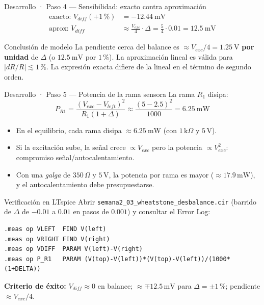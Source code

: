 \documentclass[aspectratio=169]{beamer}
\begin{document}
\begin{frame}{Desarrollo · Paso 4 — Sensibilidad: exacto contra aproximación}
  \begin{align*}
    \text{exacto: } V_{diff}(+1\,\text{\%}) &= -\SI{12.44}{\milli\volt}\\[2pt]
    \text{aprox: } V_{diff} &\approx \frac{V_{exc}}{4}\cdot\Delta = \frac{5}{4}\cdot 0.01 = \SI{12.5}{\milli\volt}
  \end{align*}
  \pause
  \begin{block}{Conclusión de modelo}
    La pendiente cerca del balance es $\approx V_{exc}/4 = \SI{1.25}{\volt}$ \textbf{por unidad} de $\Delta$
    (o $\SI{12.5}{\milli\volt}$ por $1\,\text{\%}$). La aproximación lineal es válida para $|dR/R| \lesssim 1\,\text{\%}$.
    La expresión exacta difiere de la lineal en el término de segundo orden.
  \end{block}
\end{frame}

\begin{frame}{Desarrollo · Paso 5 — Potencia de la rama sensora}
  La rama $R_1$ disipa:
  \[
    P_{R1} = \frac{\left(V_{exc} - V_{left}\right)^2}{R_1(1+\Delta)}
    \approx \frac{(5-2.5)^2}{1000} = \SI{6.25}{\milli\watt}
  \]
  \pause
  \begin{itemize}
    \item En el equilibrio, cada rama disipa $\approx \SI{6.25}{\milli\watt}$ (con $1\,\text{k}\Omega$ y $5\,\text{V}$).
    \item Si la excitación sube, la señal crece $\propto V_{exc}$ pero la potencia $\propto V_{exc}^2$: compromiso señal/autocalentamiento.
    \item Con una \emph{galga} de $350\,\Omega$ y $5\,\text{V}$, la potencia por rama es mayor
      ($\approx 17.9\,\text{mW}$), y el autocalentamiento debe presupuestarse.
  \end{itemize}
\end{frame}

\begin{frame}[fragile]{Verificación en LTspice}
  Abrir \texttt{semana2\_03\_wheatstone\_desbalance.cir} (barrido de $\Delta$ de $-0.01$ a $0.01$ en pasos de $0.001$)
  y consultar el Error Log:

  \begin{verbatim}
.meas op VLEFT  FIND V(left)
.meas op VRIGHT FIND V(right)
.meas op VDIFF  PARAM V(left)-V(right)
.meas op P_R1   PARAM (V(top)-V(left))*(V(top)-V(left))/(1000*(1+DELTA))
  \end{verbatim}

  \textbf{Criterio de éxito:} $V_{diff} \approx 0$ en balance; $\approx \mp 12.5\,\text{mV}$ para
  $\Delta = \pm 1\,\text{\%}$; pendiente $\approx V_{exc}/4$.
\end{frame}
\end{document}
